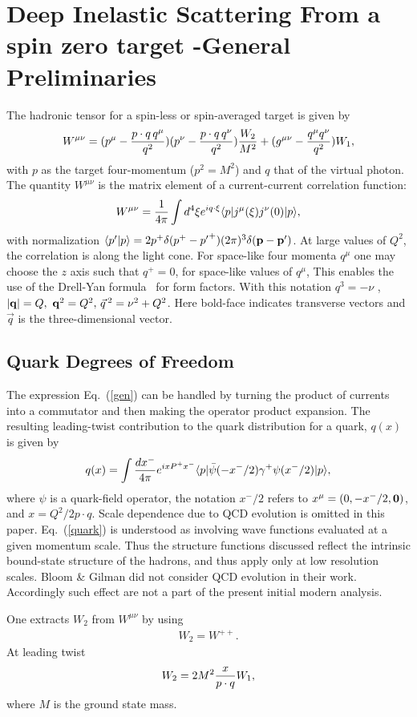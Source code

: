 \documentclass[aps,prd,amsmath,longbibliography]{revtex4-1}
\newcommand{\eq}[1]{Eq.~(\ref{#1})}
\def\bea{\begin{eqnarray}}
\def\eea{\end{eqnarray}}\def\a{\alpha}\newcommand{\bfk}{{\bf k}}\newcommand{\bfq}{{\bf q}}
\def\g{\gamma}\def\m{\mu}\def\t{\tau}\def\ve{\varepsilon}\def\l{\lambda}\def\s{\sigma}\def\n{\nu}\def\o{\omega}
\def\la{\langle}\def\ra{\rangle}\def\d{\delta}\def\bfr{{\bf r}}\def\k{\kappa}\def\G{\Gamma}\def\z{\zeta}\def\b{\beta}
\begin{document}
{\section{Deep Inelastic Scattering From a spin zero target    -General Preliminaries}
The hadronic tensor for a spin-less or spin-averaged target  is given by
\bea W^{\m\n}=(p^\m-{p\cdot  q\,q^\m\over q^2})(p^\n-{p\cdot q\,q^\n\over q^2}){W_2\over M^2}+ (g^{\m\n}-{q^\m q^\n\over q^2})W_1,\eea
with $p$ as the target  four-momentum ($p^2=M^2$) and $q$ that of the virtual photon.
The quantity $W^{\m\n}$  is the matrix element of a current-current correlation function:
\bea W^{\m\n}={1\over 4\pi}\int d^4\xi e^{iq\cdot\xi}\la p|j^\m(\xi)j^\n(0)|p\ra,\label{gen}\eea
with  normalization  $\la p'|p\ra= 2p^+ \d(p^+-{p'}^+) (2\pi)^3 \d(\bfp-\bfp')$.
 At large values of $Q^2$, the correlation is along the light cone.  For space-like four momenta $q^\m$ one may choose 
  the $z$ axis such that  $q^+=0$, for space-like values of $q^\m$, This enables the use of the  Drell-Yan formula~\cite{PhysRevLett.24.181} for form factors. With this notation  $q^3=-\nu$ , $|\bfq|=Q,\ \bfq^2 =Q^2, \,\vec {q}\,^2=\n^2+Q^2$.  Here bold-face indicates transverse vectors and $\vec q$ is the three-dimensional vector.
 
 \subsection{Quark Degrees of Freedom}
 
The expression \eq{gen} can be handled   by turning the product of currents into a commutator and then making the operator product expansion. The resulting leading-twist contribution to the quark distribution for a quark, $q(x)$ is given by
\bea q(x)=\int {dx^-\over 4\pi}e^{i x P^+x^-} \la p| \bar \psi(-x^-/2)\g^+\psi(x^-/2)|p\ra,\label{quark}\eea
where $\psi$ is a quark-field operator, the notation $x^-/2$ refers to $x^\m=(0,-x^-/2,{\bf 0})$,  and  $x=Q^2/2p\cdot q$.  Scale dependence due to QCD evolution is omitted in this paper. \eq{quark} is understood as involving wave functions evaluated at a given momentum scale.  Thus the structure functions discussed reflect the intrinsic bound-state structure of the hadrons, and thus  apply only at low resolution scales.
Bloom \& Gilman did not consider QCD evolution in their work. Accordingly such effect are not a part of the present initial modern analysis.

One extracts $W_2$ from $W^{\m\n}$ by using
\bea W_2=
 W^{++}.\eea 
 At leading twist
 \bea W_2=2M^2 {x\over p\cdot q}W_1,\label{rel}\eea
 where $M$ is the ground state mass. 

}
\end{document}

